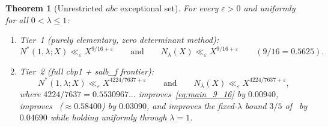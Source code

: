 \documentclass[11pt,a4paper]{amsart}
\theoremstyle{plain}
\newtheorem{theorem}{Theorem}[section]
\theoremstyle{definition}
\theoremstyle{remark}
\newcommand{\eps}{\varepsilon}
\begin{document}
\begin{theorem}[Unrestricted $abc$ exceptional set]\label{thm:unrestricted}
For every $\eps > 0$ and uniformly for all $0 < \lambda \le 1$:
\begin{enumerate}[label=(\roman*)]
\item \emph{Tier~1 (purely elementary, zero determinant method):}
\begin{equation}\label{eq:main_9_16}
  N^*(1,\lambda;X) \ll_\eps X^{9/16 + \eps} \qquad\text{and}\qquad N_\lambda(X) \ll_\eps X^{9/16 + \eps} \qquad (9/16 = 0.5625).
\end{equation}
\item \emph{Tier~2 (full \textsf{cbp1} + \textsf{salb\_f} frontier):}
\begin{equation}\label{eq:main_full}
  N^*(1,\lambda;X) \ll_\eps X^{4224/7637 + \eps} \qquad\text{and}\qquad N_\lambda(X) \ll_\eps X^{4224/7637 + \eps},
\end{equation}
where $4224/7637 = 0.5530967\ldots$ improves~\eqref{eq:main_9_16} by $0.00940$, improves~\cite{Zeng2026} ($\approx 0.58400$) by $0.03090$, and improves the fixed-$\lambda$ bound $3/5$ of~\cite[Theorem~1.3]{BLT2026} by $0.04690$ while holding uniformly through $\lambda = 1$.
\end{enumerate}
\end{theorem}
\end{document}
